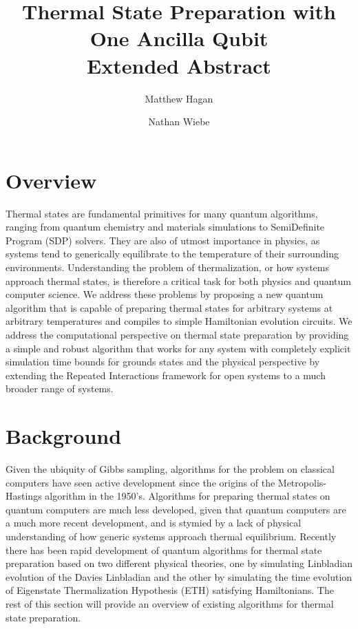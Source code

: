 \documentclass[
11pt,
 amsmath,amssymb,
 aps,
onecolumn, 
nofootinbib]{revtex4-2}
\begin{document}
\title{Thermal State Preparation with One Ancilla Qubit \\
Extended Abstract}

\author{Matthew Hagan}

\author{Nathan Wiebe}
%
%
%

\maketitle

\section{Overview}
Thermal states are fundamental primitives for many quantum algorithms, ranging from quantum chemistry and materials simulations to SemiDefinite Program (SDP) solvers. They are also of utmost importance in physics, as systems tend to generically equilibrate to the temperature of their surrounding environments. Understanding the problem of thermalization, or how systems approach thermal states, is therefore a critical task for both physics and quantum computer science. We address these problems by proposing a new quantum algorithm that is capable of preparing thermal states for arbitrary systems at arbitrary temperatures and compiles to simple Hamiltonian evolution circuits. We address the computational perspective on thermal state preparation by providing a simple and robust algorithm that works for any system with completely explicit simulation time bounds for grounds states and the physical perspective by extending the Repeated Interactions framework for open systems to a much broader range of systems. 

\section{Background}

Given the ubiquity of Gibbs sampling, algorithms for the problem on classical computers have seen active development since the origins of the Metropolis-Hastings algorithm in the 1950's. Algorithms for preparing thermal states on quantum computers are much less developed, given that quantum computers are a much more recent development, and is stymied by a lack of physical understanding of how generic systems approach thermal equilibrium. Recently there has been rapid development of quantum algorithms for thermal state preparation based on two different physical theories, one by simulating Linbladian evolution of the Davies Linbladian and the other by simulating the time evolution of Eigenstate Thermalization Hypothesis (ETH) satisfying Hamiltonians. The rest of this section will provide an overview of existing algorithms for thermal state preparation. 
\end{document}
